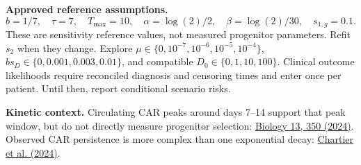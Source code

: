 \documentclass[10pt]{article}
\begin{document}
\textbf{Approved reference assumptions.}
\[
b=1/7,\quad \tau=7,\quad T_{\max}=10,\quad
\alpha=\log(2)/2,\quad \beta=\log(2)/30,\quad s_{1,g}=0.1.
\]
These are sensitivity reference values, not measured progenitor parameters. Refit \(s_2\) when they change. Explore \(\mu\in\{0,10^{-7},10^{-6},10^{-5},10^{-4}\}\),
\(b s_D\in\{0,0.001,0.003,0.01\}\), and compatible \(D_0\in\{0,1,10,100\}\).
Clinical outcome likelihoods require reconciled diagnosis and censoring times and enter once per patient. Until then, report conditional scenario risks.

\small
\textbf{Kinetic context.} Circulating CAR peaks around days 7--14 support that peak window, but do not directly measure progenitor selection:
\href{https://doi.org/10.3390/biology13050350}{Biology 13, 350 (2024)}.
Observed CAR persistence is more complex than one exponential decay:
\href{https://pubmed.ncbi.nlm.nih.gov/39240498/}{Chartier et al. (2024)}.
\end{document}
